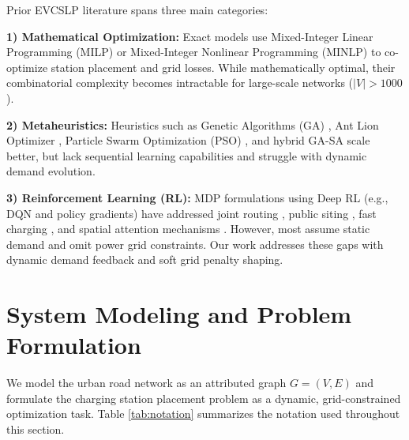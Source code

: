 \documentclass[10pt, conference, a4paper, compsocconf]{IEEEtran}
\begin{document}
Prior EVCSLP literature spans three main categories:

\textbf{1) Mathematical Optimization:} Exact models use Mixed-Integer Linear Programming (MILP) \cite{veisi2021optimal, erbas2022optimal} or Mixed-Integer Nonlinear Programming (MINLP) \cite{vu2025vietnam, zhang2023commercial} to co-optimize station placement and grid losses. While mathematically optimal, their combinatorial complexity becomes intractable for large-scale networks ($|V| > 1000$).

\textbf{2) Metaheuristics:} Heuristics such as Genetic Algorithms (GA) \cite{zhang2022location}, Ant Lion Optimizer \cite{ali2022improved}, Particle Swarm Optimization (PSO) \cite{wang2019pso}, and hybrid GA-SA \cite{rahman2024hybrid} scale better, but lack sequential learning capabilities and struggle with dynamic demand evolution.

\textbf{3) Reinforcement Learning (RL):} MDP formulations using Deep RL (e.g., DQN and policy gradients) have addressed joint routing \cite{khan2023joint}, public siting \cite{li2021optimal}, fast charging \cite{zhao2023fast}, and spatial attention mechanisms \cite{von2022reinforcement, liu2023optimal, chen2025scalable, hassan2025optimizing}. However, most assume static demand and omit power grid constraints. Our work addresses these gaps with dynamic demand feedback and soft grid penalty shaping.

\section{System Modeling and Problem Formulation}
\label{sec:model}

We model the urban road network as an attributed graph $G=(V,E)$ and formulate the charging station placement problem as a dynamic, grid-constrained optimization task. Table \ref{tab:notation} summarizes the notation used throughout this section.
\end{document}
